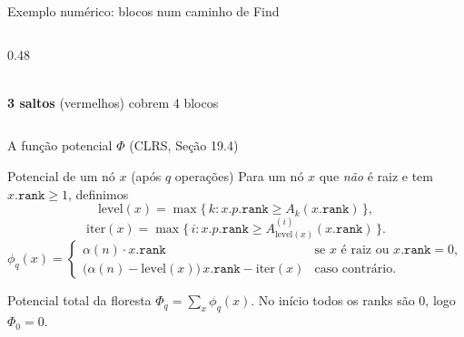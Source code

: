 \documentclass[aspectratio=169]{beamer}
\begin{document}
\begin{frame}[shrink=28]{Exemplo numérico: blocos num caminho de Find}
\begin{columns}[T]
\begin{column}{0.48\textwidth}
\\[2pt]
      {\footnotesize\color{UFSRed}\textbf{3 saltos} (vermelhos) cobrem 4 blocos}
    \end{column}
  \end{columns}
\end{frame}

\begin{frame}[shrink=15]{A função potencial $\Phi$ (CLRS, Seção 19.4)}%
  \begin{block}{Potencial de um nó $x$ (após $q$ operações)}
    Para um nó $x$ que \emph{não} é raiz e tem $x.\texttt{rank}\geq 1$, definimos
    \[
      \mathrm{level}(x) = \max\{\,k : x.p.\texttt{rank} \geq A_k(x.\texttt{rank})\,\},
    \]
    \[
      \mathrm{iter}(x) = \max\{\,i : x.p.\texttt{rank} \geq A_{\mathrm{level}(x)}^{(i)}(x.\texttt{rank})\,\}.
    \]
    \vspace{-0.25cm}
    \[
      \phi_q(x) =
      \begin{cases}
        \alpha(n)\cdot x.\texttt{rank}
          & \text{se } x \text{ é raiz ou } x.\texttt{rank}=0,\\[4pt]
        \bigl(\alpha(n)-\mathrm{level}(x)\bigr)\,x.\texttt{rank} - \mathrm{iter}(x)
          & \text{caso contrário.}
      \end{cases}
    \]
  \end{block}
  \begin{exampleblock}{Potencial total da floresta}
    $\displaystyle \Phi_q = \sum_{x} \phi_q(x)$.\quad
    No início todos os ranks são $0$, logo $\Phi_0 = 0$.
  \end{exampleblock}
\end{frame}
\end{document}
